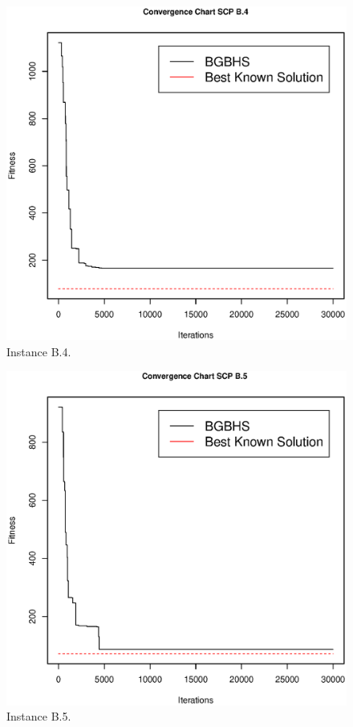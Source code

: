 \begin{figure}[]
\centering
\includegraphics[scale=.45]{Resultados/scpB4.eps}
\caption{Instance B.4.}
\label{fig:Instance.B.4}
\end{figure}

\begin{figure}[]
\centering
\includegraphics[scale=.45]{Resultados/scpB5.eps}
\caption{Instance B.5.}
\label{fig:Instance.B.5}
\end{figure}


